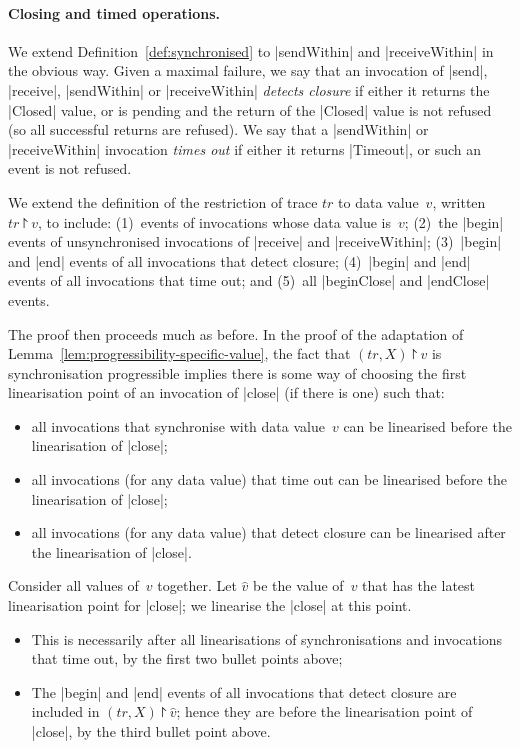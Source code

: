 
\paragraph{Closing and timed operations.}

We extend Definition~\ref{def:synchronised} to |sendWithin| and
|receiveWithin| in the obvious way.  Given a maximal failure, we say that an
invocation of |send|, |receive|, |sendWithin| or |receiveWithin| \emph{detects
  closure} if either it returns the |Closed| value, or is pending and the
return of the |Closed| value is not refused (so all successful returns are
refused).  We say that a |sendWithin| or |receiveWithin| invocation
\emph{times out} if either it returns |Timeout|, or such an event is not
refused.

We extend the definition of the restriction of trace $tr$ to data value~$v$,
written $tr \project v$, to include: (1)~events of invocations whose data
value is~$v$; (2)~the |begin| events of unsynchronised invocations of
|receive| and |receiveWithin|; (3)~|begin| and |end| events of all invocations
that detect closure; (4)~|begin| and |end| events of all invocations that
time out; and (5)~all |beginClose| and |endClose| events.

The proof then proceeds much as before.  In the proof of the adaptation of
Lemma~\ref{lem:progressibility-specific-value}, the fact that $(tr,X) \project
v$ is synchronisation progressible implies there is some way of choosing the
first linearisation point of an invocation of |close| (if there is one) such
that:
%
\begin{itemize}
\item all invocations that synchronise with data value~$v$ can be linearised
  before the linearisation of |close|;

\item all invocations (for any data value) that time out can be linearised
  before the linearisation of |close|;

\item all invocations (for any data value) that detect closure can be
  linearised after the linearisation of |close|.
\end{itemize}
%
Consider all values of~$v$ together.  Let $\hat{v}$ be the value of~$v$ that
has the latest linearisation point for |close|; we linearise the |close| at
this point.
%
\begin{itemize}
\item This is necessarily after all linearisations of synchronisations and
  invocations that time out, by the first two bullet points above;

\item The |begin| and |end| events of all invocations that detect closure are
  included in $(tr,X) \project \hat{v}$; hence they are before the 
  linearisation point of |close|, by the third bullet point above.
\end{itemize}

